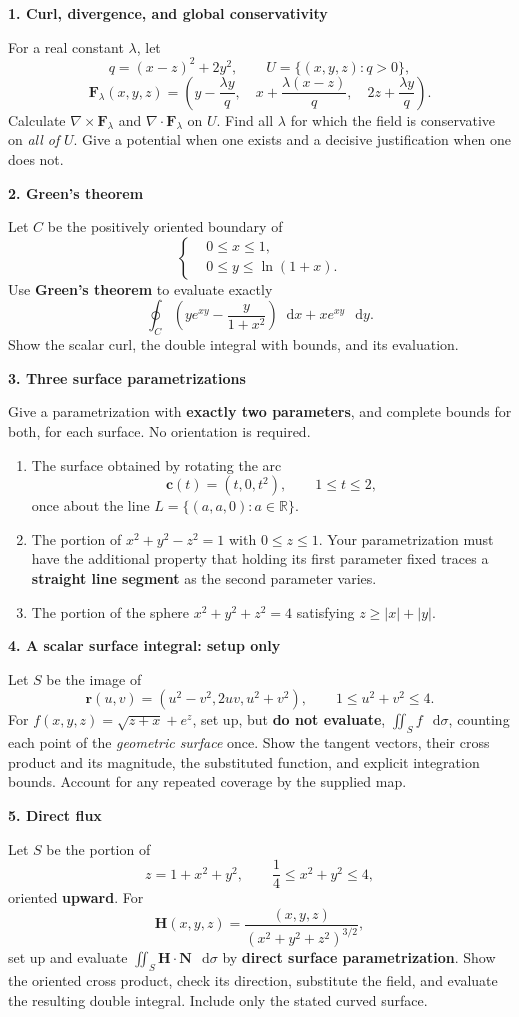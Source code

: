 \documentclass[11pt,letterpaper]{article}
\newcommand{\curl}{\nabla\times}
\newcommand{\dv}{\nabla\cdot}
\renewcommand{\vec}[1]{\mathbf{#1}}
\newcommand{\dd}{\mathop{}\!\mathrm{d}}
\newcommand{\examproblem}[3]{%
  \par\medskip\Needspace{5\baselineskip}
  \noindent\textbf{#1. #2}\par\nobreak
}
\begin{document}
\examproblem{1}{Curl, divergence, and global conservativity}{10}
For a real constant $\lambda$, let
\[
q=(x-z)^2+2y^2,\qquad U=\{(x,y,z):q>0\},
\]
\[
\vec F_\lambda(x,y,z)=
\left(y-\frac{\lambda y}{q},\quad
x+\frac{\lambda(x-z)}q,\quad
2z+\frac{\lambda y}q\right).
\]
Calculate $\curl\vec F_\lambda$ and $\dv\vec F_\lambda$ on $U$.
Find all $\lambda$ for which the field is conservative on \emph{all of}
$U$. Give a potential when one exists and a decisive justification when
one does not.

\examproblem{2}{Green's theorem}{12}
Let $C$ be the positively oriented boundary of
\[
\left\{\begin{aligned}
&0\le x\le1,\\
&0\le y\le\ln(1+x).
\end{aligned}\right.
\]
Use \textbf{Green's theorem} to evaluate exactly
\[
\oint_C\left(ye^{xy}-\frac{y}{1+x^2}\right)\dd x
+xe^{xy}\,\dd y.
\]
Show the scalar curl, the double integral with bounds, and its evaluation.

\examproblem{3}{Three surface parametrizations}{12}
Give a parametrization with \textbf{exactly two parameters}, and complete
bounds for both, for each surface. No orientation is required.
\begin{enumerate}[label=(\alph*)]
\item The surface obtained by rotating the arc
\[
\vec c(t)=(t,0,t^2),\qquad1\le t\le2,
\]
once about the line $L=\{(a,a,0):a\in\mathbb R\}$.
\item The portion of $x^2+y^2-z^2=1$ with $0\le z\le1$.
Your parametrization must have the additional property that holding its
first parameter fixed traces a \textbf{straight line segment} as the
second parameter varies.
\item The portion of the sphere $x^2+y^2+z^2=4$ satisfying
$z\ge |x|+|y|$.
\end{enumerate}

\examproblem{4}{A scalar surface integral: setup only}{12}
Let $S$ be the image of
\[
\vec r(u,v)=(u^2-v^2,2uv,u^2+v^2),\qquad1\le u^2+v^2\le4.
\]
For $f(x,y,z)=\sqrt{z+x}+e^z$, set up, but \textbf{do not evaluate},
$\displaystyle\iint_S f\,\dd\sigma$, counting each point of the
\emph{geometric surface} once. Show the tangent vectors, their cross
product and its magnitude, the substituted function, and explicit
integration bounds. Account for any repeated coverage by the supplied map.

\examproblem{5}{Direct flux}{20}
Let $S$ be the portion of
\[
z=1+x^2+y^2,\qquad \frac14\le x^2+y^2\le4,
\]
oriented \textbf{upward}. For
\[
\vec H(x,y,z)=\frac{(x,y,z)}{(x^2+y^2+z^2)^{3/2}},
\]
set up and evaluate $\displaystyle\iint_S\vec H\cdot\vec N\,\dd\sigma$
by \textbf{direct surface parametrization}. Show the oriented cross
product, check its direction, substitute the field, and evaluate the
resulting double integral. Include only the stated curved surface.
\end{document}
